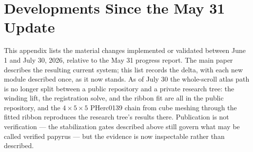 \appendix
\section{Developments Since the May 31 Update}
\label{app:developments}

This appendix lists the material changes implemented or validated between June 1 and July 30, 2026, relative to the May 31 progress report. The main paper describes the resulting current system; this list records the delta, with each new module described once, as it now stands. As of July 30 the whole-scroll atlas path is no longer split between a public repository and a private research tree: the winding lift, the registration solve, and the ribbon fit are all in the public repository, and the $4\times5\times5$ PHerc0139 chain from cube meshing through the fitted ribbon reproduces the research tree's results there. Publication is not verification --- the stabilization gates described above still govern what may be called verified papyrus --- but the evidence is now inspectable rather than described.

